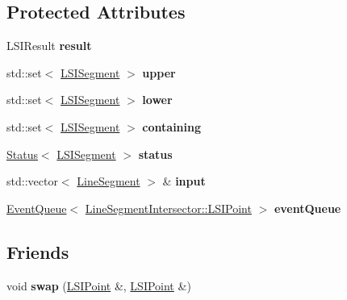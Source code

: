 \subsection*{Protected Attributes}
\begin{DoxyCompactItemize}
\item 
\mbox{\label{classLineSegmentIntersector_a596f254a15acdf01659e0eed9c949c83}} 
L\+S\+I\+Result {\bfseries result}
\item 
\mbox{\label{classLineSegmentIntersector_abebbac25196e3421773b13432e6095f8}} 
std\+::set$<$ \hyperlink{classLineSegmentIntersector_1_1LSISegment}{L\+S\+I\+Segment} $>$ {\bfseries upper}
\item 
\mbox{\label{classLineSegmentIntersector_a5371cdc13d924b19eafcbd91f33eb978}} 
std\+::set$<$ \hyperlink{classLineSegmentIntersector_1_1LSISegment}{L\+S\+I\+Segment} $>$ {\bfseries lower}
\item 
\mbox{\label{classLineSegmentIntersector_a92991afc8378f4aafee2201c115ae83d}} 
std\+::set$<$ \hyperlink{classLineSegmentIntersector_1_1LSISegment}{L\+S\+I\+Segment} $>$ {\bfseries containing}
\item 
\mbox{\label{classLineSegmentIntersector_a404283b0014c4d5c195b02b1cd922b50}} 
\hyperlink{classStatus}{Status}$<$ \hyperlink{classLineSegmentIntersector_1_1LSISegment}{L\+S\+I\+Segment} $>$ {\bfseries status}
\item 
\mbox{\label{classLineSegmentIntersector_a10c2e27236152bf4ee9f9a696ff3549e}} 
std\+::vector$<$ \hyperlink{classLineSegment}{Line\+Segment} $>$ \& {\bfseries input}
\item 
\mbox{\label{classLineSegmentIntersector_aefa3fc6020399c9f7c31a46d4ec3d9bd}} 
\hyperlink{classEventQueue}{Event\+Queue}$<$ \hyperlink{classLineSegmentIntersector_1_1LSIPoint}{Line\+Segment\+Intersector\+::\+L\+S\+I\+Point} $>$ {\bfseries event\+Queue}
\end{DoxyCompactItemize}
\subsection*{Friends}
\begin{DoxyCompactItemize}
\item 
\mbox{\label{classLineSegmentIntersector_aa1641902c18c0376d0303883d4e759e5}} 
void {\bfseries swap} (\hyperlink{classLineSegmentIntersector_1_1LSIPoint}{L\+S\+I\+Point} \&, \hyperlink{classLineSegmentIntersector_1_1LSIPoint}{L\+S\+I\+Point} \&)
\end{DoxyCompactItemize}


